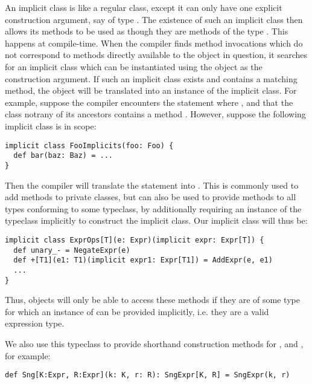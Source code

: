 An implicit class is like a regular class, except it can only have one explicit construction argument, say of type . The existence of such an implicit class then allows its methods to be used as though they are methods of the type . This happens at compile-time. When the compiler finds method invocations which do not correspond to methods directly available to the object in question, it searches for an implicit class which can be instantiated using the object as the construction argument. If such an implicit class exists and contains a matching method, the object will be translated into an instance of the implicit class.
For example, suppose the compiler encounters the statement  where , and that the class  notrany of its ancestors contains a method . However, suppose the following implicit class is in scope:
\vs\begin{lstlisting}
implicit class FooImplicits(foo: Foo) {
  def bar(baz: Baz) = ...
}
\end{lstlisting}\vs
Then the compiler will translate the statement  into . This is commonly used to add methods to private classes, but can also be used to provide methods to all types conforming to some typeclass, by additionally requiring an instance of the typeclass implicitly to construct the implicit class. Our implicit class will thus be:
\vs \begin{lstlisting}
implicit class ExprOps[T](e: Expr)(implicit expr: Expr[T]) {
  def unary_- = NegateExpr(e)
  def +[T1](e1: T1)(implicit expr1: Expr[T1]) = AddExpr(e, e1)
  ...
}
\end{lstlisting} \vs
Thus, objects will only be able to access these methods if they are of some type  for which an instance of  can be provided implicitly, i.e. they are a valid expression type.

We also use this typeclass to provide shorthand construction methods for ,  and , for example:
\begin{lstlisting}
def Sng[K:Expr, R:Expr](k: K, r: R): SngExpr[K, R] = SngExpr(k, r)
\end{lstlisting}


